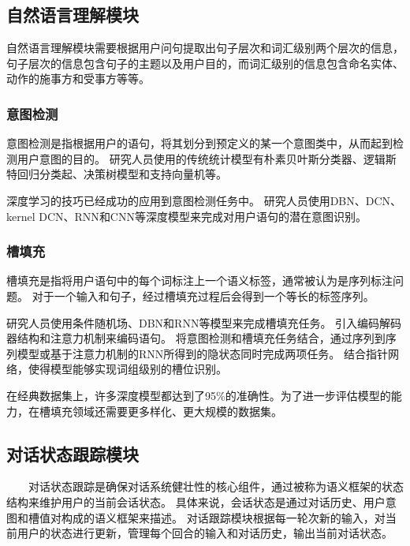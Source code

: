 \documentclass{clv3}
\begin{document}
\subsection{自然语言理解模块}
自然语言理解模块需要根据用户问句提取出句子层次和词汇级别两个层次的信息，句子层次的信息包含句子的主题以及用户目的，而词汇级别的信息包含命名实体、动作的施事方和受事方等等。

\subsubsection{意图检测}
意图检测是指根据用户的语句，将其划分到预定义的某一个意图类中，从而起到检测用户意图的目的。
研究人员使用的传统统计模型有朴素贝叶斯分类器、逻辑斯特回归分类起、决策树模型和支持向量机等。

深度学习的技巧已经成功的应用到意图检测任务中。
研究人员使用DBN\cite{sarikaya2011deep}、DCN\cite{tur2012towards}、kernel DCN\cite{deng2012use}、RNN\cite{ravuri2015recurrent}和CNN\cite{xu2013convolutional}等深度模型来完成对用户语句的潜在意图识别。

\subsubsection{槽填充}
槽填充是指将用户语句中的每个词标注上一个语义标签，通常被认为是序列标注问题。
对于一个输入和句子，经过槽填充过程后会得到一个等长的标签序列。

研究人员使用条件随机场\cite{wang2006discriminative, raymond2007generative}、DBN\cite{deoras2013deep}和RNN\cite{yao2013recurrent, mesnil2013investigation}等模型来完成槽填充任务。
\cite{simonnet2015exploring}引入编码解码器结构和注意力机制来编码语句。
\cite{liu2016attention}将意图检测和槽填充任务结合，通过序列到序列模型或基于注意力机制的RNN所得到的隐状态同时完成两项任务。
\cite{zhai2017neural}结合指针网络，使得模型能够实现词组级别的槽位识别。

在经典数据集上\cite{hemphill1990the, dahl1994expanding}，许多深度模型\cite{liu2016attention, zhai2017neural}都达到了95\%的准确性。为了进一步评估模型的能力，在槽填充领域还需要更多样化、更大规模的数据集。

\subsection{对话状态跟踪模块}
$\qquad$对话状态跟踪是确保对话系统健壮性的核心组件，通过被称为语义框架的状态结构来维护用户的当前会话状态。
具体来说，会话状态是通过对话历史、用户意图和槽值对构成的语义框架来描述。
对话跟踪模块根据每一轮次新的输入，对当前用户的状态进行更新，管理每个回合的输入和对话历史，输出当前对话状态。
\end{document}

